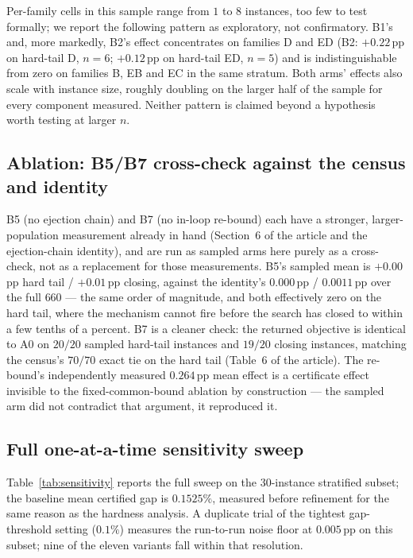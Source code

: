 \documentclass[11pt]{article}
\begin{document}
Per-family cells in this sample range from $1$ to $8$ instances, too few to
test formally; we report the following pattern as exploratory, not
confirmatory. B1's and, more markedly, B2's effect concentrates on families D
and ED (B2: $+0.22$\,pp on hard-tail D, $n=6$; $+0.12$\,pp on hard-tail ED,
$n=5$) and is indistinguishable from zero on families B, EB and EC in the same
stratum. Both arms' effects also scale with instance size, roughly doubling on
the larger half of the sample for every component measured. Neither pattern is
claimed beyond a hypothesis worth testing at larger $n$.

\subsection{Ablation: B5/B7 cross-check against the census and identity}

B5 (no ejection chain) and B7 (no in-loop re-bound) each have a stronger,
larger-population measurement already in hand (Section~6 of the article and the
ejection-chain identity), and are run as sampled arms here purely as a
cross-check, not as a replacement for those measurements. B5's sampled mean is
$+0.00$\,pp hard tail / $+0.01$\,pp closing, against the identity's $0.000$\,pp
/ $0.0011$\,pp over the full $660$ --- the same order of magnitude, and both
effectively zero on the hard tail, where the mechanism cannot fire before the
search has closed to within a few tenths of a percent. B7 is a cleaner check:
the returned objective is identical to A0 on $20/20$ sampled hard-tail instances
and $19/20$ closing instances, matching the census's $70/70$ exact tie on the
hard tail (Table~6 of the article). The re-bound's independently measured
$0.264$\,pp mean effect is a certificate effect invisible to the fixed-common-bound
ablation by construction --- the sampled arm did not contradict that argument,
it reproduced it.

\subsection{Full one-at-a-time sensitivity sweep}

Table~\ref{tab:sensitivity} reports the full sweep on the 30-instance stratified
subset; the baseline mean certified gap is $0.1525\%$, measured before
refinement for the same reason as the hardness analysis. A duplicate trial of
the tightest gap-threshold setting ($0.1\%$) measures the run-to-run noise floor
at $0.005$\,pp on this subset; nine of the eleven variants fall within that
resolution.
\end{document}
